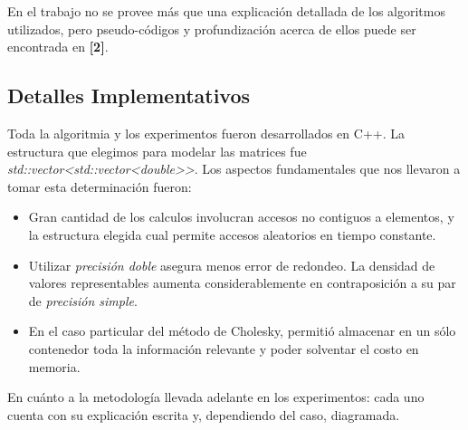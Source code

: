 En el trabajo no se provee m\'as que una explicaci\'on detallada de los algoritmos utilizados, pero pseudo-c\'odigos y profundizaci\'on acerca de ellos puede ser encontrada en \textbf{[2]}.

\subsection{Detalles Implementativos}

Toda la algoritmia y los experimentos fueron desarrollados en C++. La estructura que elegimos para modelar las matrices fue \textit{std::vector\textless std::vector\textless double\textgreater\textgreater}. Los aspectos fundamentales que nos llevaron a tomar esta determinaci\'on fueron:

\begin{itemize}
\item Gran cantidad de los calculos involucran accesos no contiguos a elementos, y la estructura elegida cual permite accesos aleatorios en tiempo constante.
\item Utilizar \textit{precisi\'on doble} asegura menos error de redondeo. La densidad de valores representables aumenta considerablemente en contraposici\'on a su par de \textit{precisi\'on simple}.
\item En el caso particular del m\'etodo de Cholesky, permiti\'o almacenar en un s\'olo contenedor toda la informaci\'on relevante y poder solventar el costo en memoria.
\end{itemize}

En cu\'anto a la metodolog\'ia llevada adelante en los experimentos: cada uno cuenta con su explicaci\'on escrita y, dependiendo del caso, diagramada.